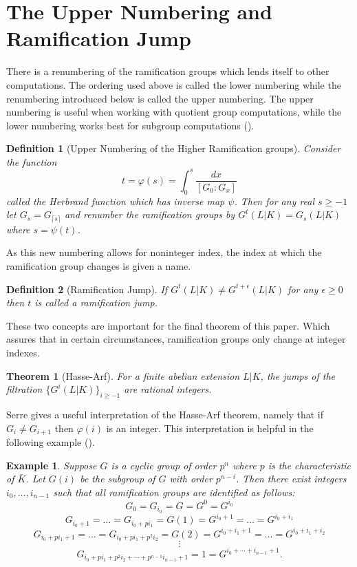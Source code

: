 \documentclass[paper=a4, fontsize=11pt]{scrartcl} %
\numberwithin{equation}{section} %
\numberwithin{figure}{section} %
\numberwithin{table}{section} %
\theoremstyle{break}
\newtheorem{defn}{Definition}
\newtheorem{thm}{Theorem}
\newtheorem{ex}{Example}
\begin{document}
\section{The Upper Numbering and Ramification Jump}
There is a renumbering of the ramification groups which lends itself to other computations. The ordering used above is called the lower numbering while the renumbering introduced below is called the upper numbering. The upper numbering is useful when working with quotient group computations, while the lower numbering works best for subgroup computations (\cite{Neukirch}).
\begin{defn}[Upper Numbering of the Higher Ramification groups]
Consider the function
$$
t = \varphi(s) = \int_{0}^{s} \frac{dx}{[G_0 : G_x]}
$$
called the Herbrand function which has inverse map $\psi$.
Then for any real $s \geq -1$ let $G_s = G_{\lceil s \rceil}$ and renumber the ramification groups by $G^t(L|K) = G_s(L|K)$ where $s=\psi(t)$. 
\end{defn}
As this new numbering allows for noninteger index, the index at which the ramification group changes is given a name.
\begin{defn}[Ramification Jump]
If $G^{t}(L|K) \not=G^{t+\epsilon}(L|K)$ for any $\epsilon \geq 0$ then $t$ is called a ramification jump.
\end{defn}
These two concepts are important for the final theorem of this paper. Which assures that in certain circumstances, ramification groups only change at integer indexes.
\begin{thm}[Hasse-Arf]
For a finite abelian extension $L|K$, the jumps of the filtration $\{G^{i}(L|K)\}_{i \geq -1}$ are rational integers.
\end{thm}
Serre gives a useful interpretation of the Hasse-Arf theorem, namely that if $G_i \not= G_{i+1}$ then $\varphi(i)$ is an integer. This interpretation is helpful in the following example (\cite{Serre}).

\begin{ex}
Suppose $G$ is a cyclic group of order $p^n$ where $p$ is the characteristic of $\bar{K}$. Let $G(i)$ be the subgroup of $G$ with order $p^{n-i}$. Then there exist integers $i_0, \ldots,i_{n-1}$ such that all ramification groups are identified as follows:
$$G_0 = G_{i_0} = G = G^0 = G^{i_0}$$
$$G_{{i_0}+1} = \ldots = G_{{i_0}+pi_1} = G(1) = G^{i_0+1} = \ldots = G^{i_0 + i_1}$$
$$G_{{i_0}+pi_1+1} = \ldots = G_{{i_0}+pi_1+p^2 i_2} = G(2) = G^{i_0+i_1+1} = \ldots = G^{i_0 + i_1+i_2}$$
$$\vdots$$
$$G_{i_0+pi_1+p^2 i_2 + \cdots + p^{n-1}i_{n-1} +1}={1}=G^{i_0+\cdots+i_{n-1}+1}.$$
\end{ex}
\end{document}
